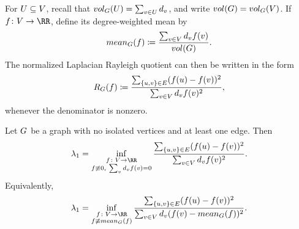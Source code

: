 For \(U\subseteq V\), recall that \(vol_{G}(U)=\sum_{v\in U}d_v\), and write \(vol(G)=vol_{G}(V)\). If \(f\colon \Vertices\to\RR\), define its degree-weighted mean by
\begin{equation}
	mean_{G}(f)\coloneqq \frac{\sum_{v\in V}d_v f(v)}{vol(G)}.
\end{equation}
The normalized Laplacian Rayleigh quotient can then be written in the form
\begin{equation}
	R_{G}(f)\coloneqq
	\frac{\sum_{\{u,v\}\in E}(f(u)-f(v))^2}{\sum_{v\in V}d_v f(v)^2},
\end{equation}
whenever the denominator is nonzero.

\begin{proposition}
	\label{prop:lambda-one-rayleigh}
	Let \(G\) be a graph with no isolated vertices and at least one edge. Then
	\begin{equation}
		\lambda_1
		=
		\inf_{\substack{f\colon \Vertices\to\RR\\f\not\equiv 0,\ \sum_v d_v f(v)=0}}
		\frac{\sum_{\{u,v\}\in\Edges}\left(f(u)-f(v)\right)^2}{\sum_{v\in \Vertices}d_v f(v)^2}.
	\end{equation}
	Equivalently,
	\begin{equation}
		\lambda_1
		=
		\inf_{\substack{f\colon \Vertices\to\RR\\f\not\equiv \GraphMean{f}}}
		\frac{\sum_{\{u,v\}\in\Edges}\left(f(u)-f(v)\right)^2}{\sum_{v\in \Vertices}d_v\left(f(v)-\GraphMean{f}\right)^2}.
	\end{equation}
\end{proposition}

